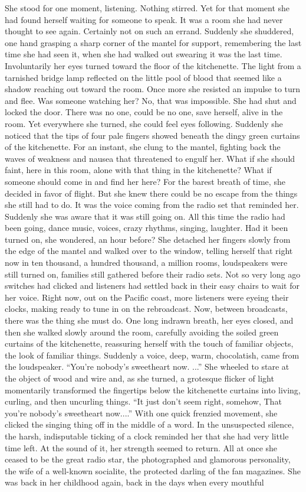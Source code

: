 \documentclass{novel}
\begin{document}
She stood for one moment, listening. Nothing stirred. Yet for that moment she had found herself waiting for someone to speak. It was a room she had never thought to see again. Certainly not on such an errand. Suddenly she shuddered, one hand grasping a sharp corner of the mantel for support, remembering the last time she had seen it, when she had walked out swearing it was the last time. Involuntarily her eyes turned toward the floor of the kitchenette. The light from a tarnished bridge lamp reflected on the little pool of blood that seemed like a shadow reaching out toward the room. Once more she resisted an impulse to turn and flee. Was someone watching her? No, that was impossible. She had shut and locked the door. There was no one, could be no one, save herself, alive in the room. Yet everywhere she turned, she could feel eyes following. Suddenly she noticed that the tips of four pale fingers showed beneath the dingy green curtains of the kitchenette. For an instant, she clung to the mantel, fighting back the waves of weakness and nausea that threatened to engulf her. What if she should faint, here in this room, alone with that thing in the kitchenette? What if someone should come in and find her here? For the barest breath of time, she decided in favor of flight. But she knew there could be no escape from the things she still had to do. It was the voice coming from the radio set that reminded her. Suddenly she was aware that it was still going on. All this time the radio had been going, dance music, voices, crazy rhythms, singing, laughter. Had it been turned on, she wondered, an hour before? She detached her fingers slowly from the edge of the mantel and walked over to the window, telling herself that right now in ten thousand, a hundred thousand, a million rooms, loudspeakers were still turned on, families still gathered before their radio sets. Not so very long ago switches had clicked and listeners had settled back in their easy chairs to wait for her voice. Right now, out on the Pacific coast, more listeners were eyeing their clocks, making ready to tune in on the rebroadcast. Now, between broadcasts, there was the thing she must do. One long indrawn breath, her eyes closed, and then she walked slowly around the room, carefully avoiding the soiled green curtains of the kitchenette, reassuring herself with the touch of familiar objects, the look of familiar things. Suddenly a voice, deep, warm, chocolatish, came from the loudspeaker. “You’re nobody’s sweetheart now. ...” She wheeled to stare at the object of wood and wire and, as she turned, a grotesque flicker of light momentarily transformed the fingertips below the kitchenette curtains into living, curling, and then uncurling things. “It just don’t seem right, somehow, That you’re nobody’s sweetheart now....” With one quick frenzied movement, she clicked the singing thing off in the middle of a word. In the unsuspected silence, the harsh, indisputable ticking of a clock reminded her that she had very little time left. At the sound of it, her strength seemed to return. All at once she ceased to be the great radio star, the photographed and glamorous personality, the wife of a well-known socialite, the protected darling of the fan magazines. She was back in her childhood again, back in the days when every mouthful 
\end{document}
